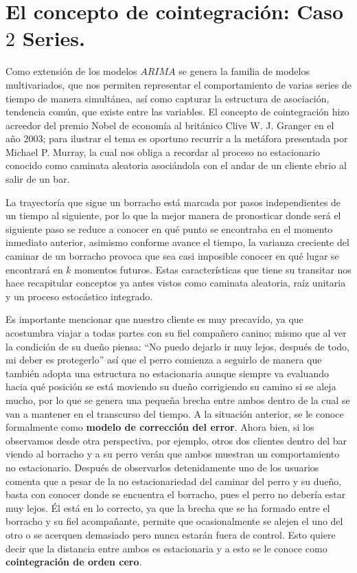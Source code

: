 

\section{El concepto de cointegración: Caso $2$ Series.}

Como extensión de los modelos $ARIMA$ se genera la familia de modelos multivariados, que nos permiten representar el comportamiento de  varias series de tiempo de manera simultánea, así como capturar la estructura de asociación, tendencia común, que existe entre las variables. El concepto de cointegración hizo acreedor del premio Nobel de economía al británico Clive W. J. Granger  en el a\~no 2003; para ilustrar el tema es oportuno recurrir a la metáfora presentada por Michael P. Murray, la cual nos obliga a recordar al proceso no estacionario conocido como caminata aleatoria asociándola con el andar de un cliente ebrio al salir de un bar.\bigskip

La trayectoría que sigue un borracho está marcada por pasos independientes de un tiempo al siguiente, por lo que la mejor manera de pronosticar donde será el siguiente paso se reduce a conocer en qué punto se encontraba en el momento inmediato anterior, asimismo conforme avance el tiempo, la varianza creciente del caminar de un borracho provoca que sea casi imposible conocer en qué lugar se encontrará en $k$ momentos futuros. Estas características que tiene su transitar nos hace recapitular conceptos ya antes vistos como caminata aleatoria, raíz unitaria y un proceso estocástico integrado.\bigskip

Es importante mencionar que nuestro cliente es muy precavido, ya que acostumbra viajar a todas partes con su fiel compañero canino; mismo que al ver  la condición de su due\~no piensa: ``No puedo dejarlo ir muy lejos, después de todo, mi deber es protegerlo''  así que el perro comienza a seguirlo de manera que también adopta una estructura no estacionaria aunque siempre va evaluando hacia qué posición se está moviendo su due\~no corrigiendo su camino si se aleja mucho, por lo que se genera una peque\~na brecha entre ambos dentro de la cual se van a mantener en el transcurso del tiempo. A la situación anterior, se le conoce formalmente como \textbf{modelo de corrección del error}. Ahora bien, si los observamos desde otra perspectiva, por ejemplo, otros dos clientes dentro del bar viendo al borracho y a su perro verán que ambos muestran un comportamiento no estacionario. Después de observarlos detenidamente uno de los usuarios comenta que a pesar de la no estacionariedad del caminar del perro y su due\~no, basta con conocer donde se encuentra el borracho, pues el perro no debería estar muy lejos. Él está en lo correcto, ya que la brecha que se ha formado entre el borracho y su fiel acompa\~nante, permite que ocasionalmente se alejen el uno del otro o se acerquen demasiado pero nunca estarán fuera de control. Esto quiere decir que la distancia entre ambos es estacionaria y a esto se le conoce como \textbf{cointegración de orden cero}. \bigskip

